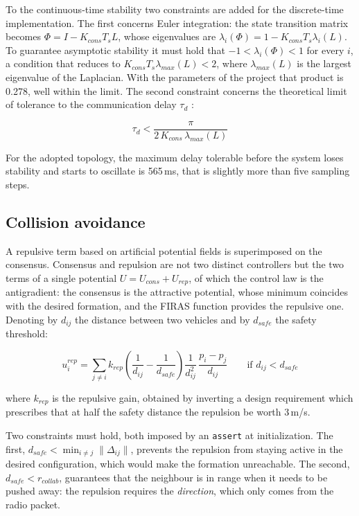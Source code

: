 \documentclass[conference,9pt]{IEEEtran}
\begin{document}
To the continuous-time stability two constraints are added for the
discrete-time implementation. The first concerns Euler integration: the state
transition matrix becomes $\Phi = I - K_{cons} T_s L$, whose eigenvalues are
$\lambda_{i}(\Phi) = 1 - K_{cons} T_s \lambda_{i}(L)$. To guarantee asymptotic
stability it must hold that $-1 < \lambda_{i}(\Phi) < 1$ for every $i$, a
condition that reduces to $K_{cons} T_s \lambda_{max}(L) < 2$, where
$\lambda_{max}(L)$ is the largest eigenvalue of the Laplacian. With the
parameters of the project that product is 0.278, well within the limit. The
second constraint concerns the theoretical limit of tolerance to the
communication delay $\tau_d$ \cite{olfati2004}:

\begin{equation}
\tau_d < \frac{\pi}{2\,K_{cons}\,\lambda_{max}(L)}
\label{eq:ritardo}
\end{equation}

For the adopted topology, the maximum delay tolerable before the system loses
stability and starts to oscillate is 565\,ms, that is slightly more than five
sampling steps.

\subsection{Collision avoidance}

A repulsive term based on artificial potential fields \cite{khatib1986} is
superimposed on the consensus. Consensus and repulsion are not two distinct
controllers but the two terms of a single potential $U = U_{cons} + U_{rep}$,
of which the control law is the antigradient: the consensus is the attractive
potential, whose minimum coincides with the desired formation, and the FIRAS
function provides the repulsive one. Denoting by $d_{ij}$ the distance between
two vehicles and by $d_{safe}$ the safety threshold:

\begin{equation}
u_i^{rep} = \sum_{j \neq i} k_{rep}
\left(\frac{1}{d_{ij}} - \frac{1}{d_{safe}}\right)\frac{1}{d_{ij}^2}\,
\frac{p_i - p_j}{d_{ij}}
\qquad \text{if } d_{ij} < d_{safe}
\label{eq:firas}
\end{equation}

where $k_{rep}$ is the repulsive gain, obtained by inverting a design
requirement which prescribes that at half the safety distance the repulsion be
worth 3\,m/s.

Two constraints must hold, both imposed by an \texttt{assert} at
initialization. The first, $d_{safe} < \min_{i \neq j}\lVert\Delta_{ij}\rVert$,
prevents the repulsion from staying active in the desired configuration, which
would make the formation unreachable. The second, $d_{safe} < r_{collab}$,
guarantees that the neighbour is in range when it needs to be pushed away: the
repulsion requires the \emph{direction}, which only comes from the radio
packet.
\end{document}
